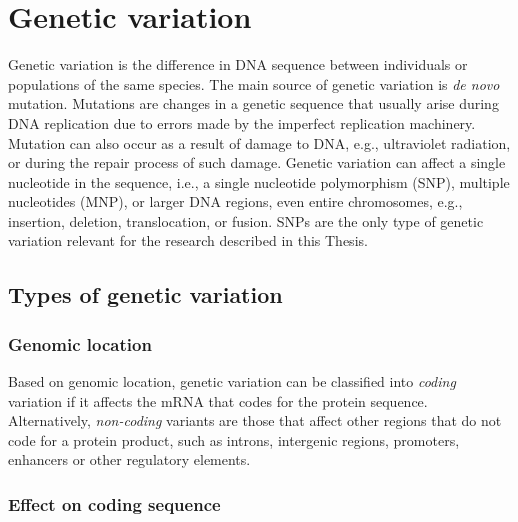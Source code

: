 \section{Genetic variation}

Genetic variation is the difference in DNA sequence between individuals or populations of the same species. The main source of genetic variation is \textit{de novo} mutation. Mutations are changes in a genetic sequence that usually arise during DNA replication due to errors made by the imperfect replication machinery. Mutation can also occur as a result of damage to DNA, e.g., ultraviolet radiation, or during the repair process of such damage. Genetic variation can affect a single nucleotide in the sequence, i.e., a single nucleotide polymorphism (SNP), multiple nucleotides (MNP), or larger DNA regions, even entire chromosomes, e.g., insertion, deletion, translocation, or fusion. SNPs are the only type of genetic variation relevant for the research described in this Thesis.

\subsection{Types of genetic variation}

\subsubsection{Genomic location}

Based on genomic location, genetic variation can be classified into \textit{coding} variation if it affects the mRNA that codes for the protein sequence. Alternatively, \textit{non-coding} variants are those that affect other regions that do not code for a protein product, such as introns, intergenic regions, promoters, enhancers or other regulatory elements.

\subsubsection{Effect on coding sequence}

